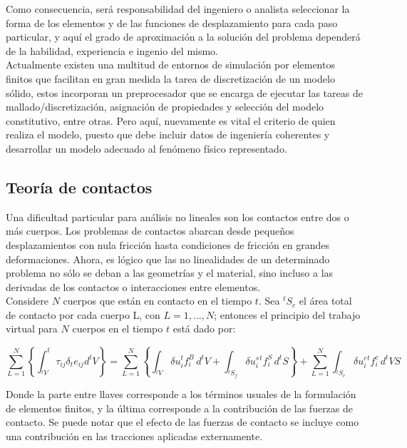 Como consecuencia, será responsabilidad del ingeniero o analista  seleccionar la forma de 
los elementos y de las funciones de desplazamiento para cada paso particular, y aquí 
el grado de aproximación a la solución del problema dependerá de la habilidad, experiencia 
e ingenio del mismo.\\

Actualmente existen una multitud de entornos de simulación por elementos finitos que 
facilitan en gran medida la tarea de discretización de un modelo sólido, estos incorporan 
un preprocesador que se encarga de ejecutar las tareas de mallado/discretización, asignación 
de propiedades y selección del modelo constitutivo, entre otras. Pero aquí, nuevamente 
es vital el criterio de quien realiza el modelo, puesto que debe incluir datos de ingeniería 
coherentes y desarrollar un modelo adecuado al fenómeno físico representado.

\subsection{Teoría de contactos}

Una dificultad particular para análisis no lineales son los contactos entre dos o más 
cuerpos. Los problemas de contactos abarcan desde pequeños desplazamientos con nula  
fricción hasta condiciones de fricción en grandes deformaciones. Ahora, es lógico que 
las no linealidades de un determinado problema no sólo se deban a las geometrías y el 
material, sino incluso a las derivadas de los contactos o interacciones entre elementos.
~\cite{bathe1996} \\

Considere $N$ cuerpos que están en contacto en el tiempo $t$. Sea $^tS_c$ el área total 
de contacto por cada cuerpo L, con $L=1,...,N$; entonces el principio del trabajo virtual 
para $N$ cuerpos en el tiempo $t$ está dado por:

\begin{equation} \label{eq:contact_n}
\sum\limits_{L=1}^N \left\{ \int_{^tV} ^t\tau_{ij} \delta_t e_{ij} d^t V \right\} = 
\sum\limits_{L=1}^N \left\{ 
\int_{^tV} \delta u_i ^tf_i^B \, d^t V + 
\int_{^tS_f} \delta u_i^s ^tf_i^S \, d^t S
\right\} + 
\sum\limits_{L=1}^N \int_{^tS_c} \delta u_i^c ^tf_i^c \, d^t VS
\end{equation}

Donde la parte entre llaves corresponde a los términos usuales de la formulación de elementos 
finitos, y la última corresponde a la contribución de las fuerzas de contacto. Se puede 
notar que el efecto de las fuerzas de contacto se incluye como una contribución en las 
tracciones aplicadas externamente.\\

